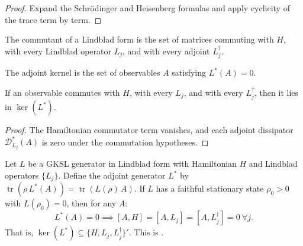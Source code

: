 \begin{proof}
    \leanok
    Expand the Schr\"odinger and Heisenberg formulas and apply cyclicity of the trace term by term.
\end{proof}

\begin{definition}
    \label{def:commutant_ch12}
    \leanok
    The commutant of a Lindblad form is the set of matrices commuting with $H$,
    with every Lindblad operator $L_j$, and with every adjoint $L_j^\dagger$.
\end{definition}

\begin{definition}
    \label{def:adjoint_kernel_ch12}
    \leanok
    The adjoint kernel is the set of observables $A$ satisfying $L^*(A)=0$.
\end{definition}

\begin{theorem}
    \label{thm:commutant_subset_adjointKernel_ch12}
    \leanok
    If an observable commutes with $H$, with every $L_j$, and with every
    $L_j^\dagger$, then it lies in $\ker(L^*)$.
\end{theorem}

\begin{proof}
    \leanok
    The Hamiltonian commutator term vanishes, and each adjoint dissipator
    $\mathcal{D}_{L_j}^*(A)$ is zero under the commutation hypotheses.
\end{proof}

\begin{theorem}
    \label{thm:adjointKernel_eq_commutant}
    \leanok
    Let $L$ be a GKSL generator in Lindblad form with Hamiltonian $H$
    and Lindblad operators $\{L_j\}$.
    Define the adjoint generator $L^*$ by
    $\operatorname{tr}(\rho\,L^*(A)) = \operatorname{tr}(L(\rho)\,A)$.
    If $L$ has a faithful stationary state $\rho_0 > 0$ with $L(\rho_0) = 0$,
    then for any $A$:
    \[
        L^*(A) = 0
        \implies
        [A,H] = [A,L_j] = [A,L_j^\dagger] = 0\ \forall j.
    \]
    That is, $\ker(L^*) \subseteq \{H, L_j, L_j^\dagger\}'$.
    This is \cite[Theorem~7.2]{Wolf2012Quantum}.
\end{theorem}

